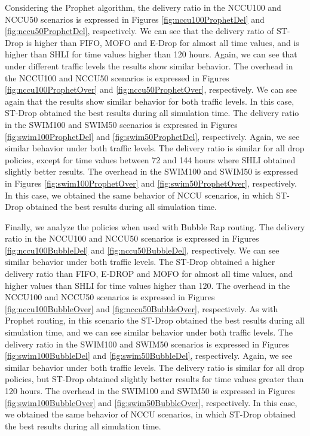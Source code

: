 Considering the Prophet algorithm, the delivery ratio in the NCCU100 and NCCU50 scenarios is expressed in Figures \ref{fig:nccu100ProphetDel} and \ref{fig:nccu50ProphetDel},
respectively. We can see that the delivery ratio of ST-Drop is higher than FIFO, MOFO and E-Drop for almost all time values, and is higher than SHLI for time values higher
than 120 hours. Again, we can see that under different traffic levels the results show similar behavior. The overhead in the NCCU100 and NCCU50 scenarios is expressed in Figures
\ref{fig:nccu100ProphetOver} and \ref{fig:nccu50ProphetOver}, respectively. We can see again that the results show similar behavior for both traffic levels.
In this case, ST-Drop obtained the best results during all simulation time. The delivery ratio in the SWIM100 and SWIM50 scenarios is expressed in Figures
\ref{fig:swim100ProphetDel} and \ref{fig:swim50ProphetDel}, respectively. Again, we see similar behavior under both traffic levels. The delivery ratio is similar
for all drop policies, except for time values between 72 and 144 hours where SHLI obtained slightly better results. The overhead in the SWIM100 and SWIM50 is
expressed in Figures \ref{fig:swim100ProphetOver} and \ref{fig:swim50ProphetOver}, respectively. In this case, we obtained the same behavior of NCCU scenarios,
in which ST-Drop obtained the best results during all simulation time.

Finally, we analyze the policies when used with Bubble Rap routing. The delivery ratio in the NCCU100 and NCCU50 scenarios is expressed in Figures \ref{fig:nccu100BubbleDel}
and \ref{fig:nccu50BubbleDel}, respectively. We can see similar behavior under both traffic levels. The ST-Drop obtained a higher delivery ratio than FIFO,
E-DROP and MOFO for almost all time values, and higher values than SHLI for time values higher than 120. The overhead in the NCCU100 and NCCU50 scenarios is expressed
in Figures \ref{fig:nccu100BubbleOver} and \ref{fig:nccu50BubbleOver}, respectively. As with Prophet routing, in this scenario the ST-Drop obtained the best
results during all simulation time, and we can see similar behavior under both traffic levels. The delivery ratio in the SWIM100 and SWIM50 scenarios is expressed in
Figures \ref{fig:swim100BubbleDel} and \ref{fig:swim50BubbleDel}, respectively. Again, we see similar behavior under both traffic levels. The delivery ratio is similar
for all drop policies, but ST-Drop obtained slightly better results for time values greater than 120 hours. The overhead in the SWIM100 and SWIM50 is expressed in Figures
\ref{fig:swim100BubbleOver} and \ref{fig:swim50BubbleOver}, respectively. In this case, we obtained the same behavior of NCCU scenarios, in which ST-Drop obtained the best
results during all simulation time.

